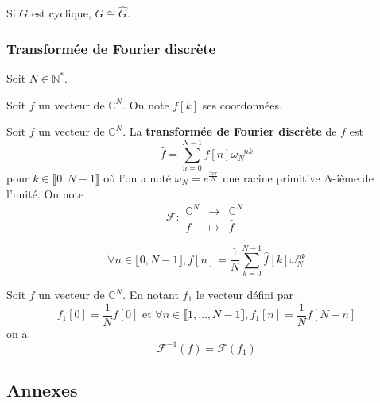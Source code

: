 	\begin{corollary}
		Si $G$ est cyclique, $G \cong \widehat{G}$.
	\end{corollary}
	
	\subsubsection{Transformée de Fourier discrète}
	
	
	Soit $N \in \mathbb{N}^*$.
	
	\begin{notation}
		Soit $f$ un vecteur de $\mathbb{C}^{N}$. On note $f[k]$ ses coordonnées.
	\end{notation}
	
	\begin{definition}
		Soit $f$ un vecteur de $\mathbb{C}^{N}$.
		La \textbf{transformée de Fourier discrète} de $f$ est
		\[ \widehat{f} = \sum_{n=0}^{N-1} f[n] \omega_N^{-nk} \]
		pour $k \in \llbracket 0, N-1 \rrbracket$ où l'on a noté $\omega_N = e^{\frac{2i\pi}{N}}$ une racine primitive $N$-ième de l'unité.
		On note
		\[
		\mathcal{F} :
		\begin{array}{ccc}
			\mathbb{C}^{N} &\rightarrow& \mathbb{C}^{N} \\
			f &\mapsto& \widehat{f}
		\end{array}
		\]
	\end{definition}
	
	\begin{proposition}
		\[ \forall n \in \llbracket 0, N-1 \rrbracket, f[n] = \frac{1}{N} \sum_{k=0}^{N-1} \widehat{f}[k] \omega_N^{nk} \]
	\end{proposition}
	
	\begin{corollary}
		Soit $f$ un vecteur de $\mathbb{C}^{N}$. En notant $f_1$ le vecteur défini par
		\[ f_1[0] = \frac{1}{N} f[0] \text{ et } \forall n \in \llbracket 1, \dots, N-1 \rrbracket, f_1[n] = \frac{1}{N} f[N-n] \]
		on a
		\[ \mathcal{F}^{-1}(f) = \mathcal{F}(f_1) \]
	\end{corollary}
	
	\newpage
	\subsection*{Annexes}
	
	

